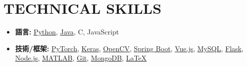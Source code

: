 \documentclass[letterpaper,11pt,UTF8]{article}
\makeatletter
\newcommand{\resumeItem}[1]{
  \item\small{
    {#1 \vspace{-2pt}}
  }
}
\newcommand{\resumeSubheading}[4]{
  \vspace{-2pt}\item
    \begin{tabular*}{1.0\textwidth}[t]{l@{\extracolsep{\fill}}r}
      \textbf{\large#1} & \textbf{\small #2} \\
      \textit{\large#3} & \textit{\small #4} \\
      
    \end{tabular*}\vspace{-7pt}
}
\newcommand{\resumeSubHeadingListStart}{\begin{itemize}[leftmargin=0.0in, label={}]}
\newcommand{\resumeSubHeadingListEnd}{\end{itemize}}
\newcommand{\resumeItemListStart}{\begin{itemize}}
\newcommand{\resumeItemListEnd}{\end{itemize}\vspace{-5pt}}
\newcommand\sbullet[1][.5]{\mathbin{\vcenter{\hbox{\scalebox{#1}{$\bullet$}}}}}
\makeatother
\begin{document}
\section{TECHNICAL SKILLS}
  \resumeItemListStart
    \resumeItem{\textbf{\normalsize{語言:}}{ \normalsize{\href{https://www.python.org/}{Python}, \href{https://www.java.com/}{Java}, C, JavaScript}}}
    \resumeItem{\textbf{\normalsize{技術/框架:}}{ \normalsize{\href{https://pytorch.org/}{PyTorch}, \href{https://keras.io/}{Keras}, \href{https://opencv.org/}{OpenCV}, \href{https://spring.io/projects/spring-boot}{Spring Boot}, \href{https://vuejs.org/}{Vue.js}, \href{https://www.mysql.com/}{MySQL}, \href{https://flask.palletsprojects.com/}{Flask}, \href{https://nodejs.org/}{Node.js}, \href{https://www.mathworks.com/products/matlab.html}{MATLAB}, \href{https://git-scm.com/}{Git}, \href{https://www.mongodb.com/}{MongoDB}, \href{https://www.latex-project.org/}{\LaTeX}}}}
  \resumeItemListEnd 


 

\end{document}
